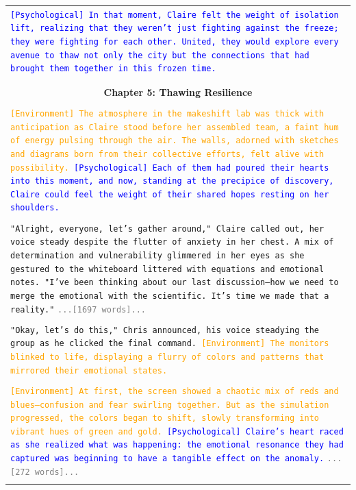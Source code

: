 \documentclass[letterpaper]{article} %
\begin{document}
\begin{small}
\begin{longtable}{p{\textwidth}}
    \texttt{\textcolor{blue}{[Psychological] In that moment, Claire felt the weight of isolation lift, realizing that they weren't just fighting against the freeze; they were fighting for each other. United, they would explore every avenue to thaw not only the city but the connections that had brought them together in this frozen time.}} \\\\

    \midrule \\
    \multicolumn{1}{c}{\normalsize \textbf{Chapter 5: Thawing Resilience}} \\\\

    \texttt{\textcolor{orange}{[Environment] The atmosphere in the makeshift lab was thick with anticipation as Claire stood before her assembled team, a faint hum of energy pulsing through the air. The walls, adorned with sketches and diagrams born from their collective efforts, felt alive with possibility.} \textcolor{blue}{[Psychological] Each of them had poured their hearts into this moment, and now, standing at the precipice of discovery, Claire could feel the weight of their shared hopes resting on her shoulders.}} \\\\

    \texttt{"Alright, everyone, let's gather around," Claire called out, her voice steady despite the flutter of anxiety in her chest. A mix of determination and vulnerability glimmered in her eyes as she gestured to the whiteboard littered with equations and emotional notes. "I've been thinking about our last discussion—how we need to merge the emotional with the scientific. It's time we made that a reality."}
    \texttt{\textcolor{gray}{...[1697 words]...}} \\\\

    \texttt{"Okay, let's do this," Chris announced, his voice steadying the group as he clicked the final command. \textcolor{orange}{[Environment] The monitors blinked to life, displaying a flurry of colors and patterns that mirrored their emotional states.}} \\\\

    \texttt{\textcolor{orange}{[Environment] At first, the screen showed a chaotic mix of reds and blues—confusion and fear swirling together. But as the simulation progressed, the colors began to shift, slowly transforming into vibrant hues of green and gold.} \textcolor{blue}{[Psychological] Claire's heart raced as she realized what was happening: the emotional resonance they had captured was beginning to have a tangible effect on the anomaly.}}
    \texttt{\textcolor{gray}{...[272 words]...}} \\\\


\end{longtable}
\end{small}
\end{document}
